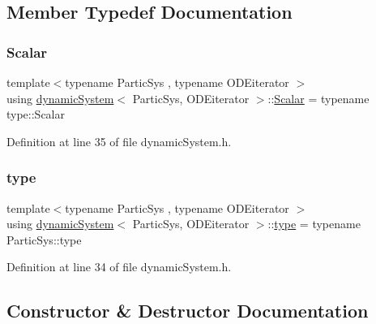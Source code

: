 \subsection{Member Typedef Documentation}
\mbox{\label{classdynamic_system_a6eb7b06a4ee5721a1ee0855a854c3431}} 
\subsubsection{\texorpdfstring{Scalar}{Scalar}}
{\footnotesize\ttfamily template$<$typename Partic\+Sys , typename O\+D\+Eiterator $>$ \\
using \mbox{\hyperlink{classdynamic_system}{dynamic\+System}}$<$ Partic\+Sys, O\+D\+Eiterator $>$\+::\mbox{\hyperlink{classdynamic_system_a6eb7b06a4ee5721a1ee0855a854c3431}{Scalar}} =  typename type\+::\+Scalar}



Definition at line 35 of file dynamic\+System.\+h.

\mbox{\label{classdynamic_system_a518990ebef8f3f6257e6ef0e49fe013e}} 
\subsubsection{\texorpdfstring{type}{type}}
{\footnotesize\ttfamily template$<$typename Partic\+Sys , typename O\+D\+Eiterator $>$ \\
using \mbox{\hyperlink{classdynamic_system}{dynamic\+System}}$<$ Partic\+Sys, O\+D\+Eiterator $>$\+::\mbox{\hyperlink{classdynamic_system_a518990ebef8f3f6257e6ef0e49fe013e}{type}} =  typename Partic\+Sys\+::type}



Definition at line 34 of file dynamic\+System.\+h.



\subsection{Constructor \& Destructor Documentation}
\mbox{\label{classdynamic_system_a239af38fcf35f3fe32d5ae5e183e4cca}} 
